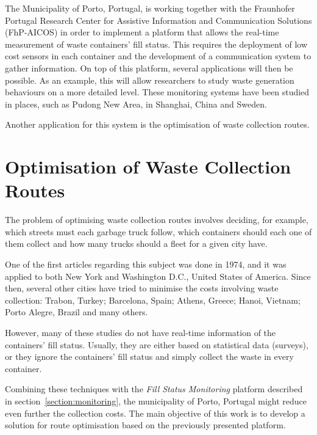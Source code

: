 The Municipality of Porto, Portugal, is working together with the Fraunhofer
Portugal Research Center for Assistive Information and Communication Solutions
(FhP-AICOS) in order to implement a platform that allows the real-time
measurement of waste containers' fill status. This requires the deployment of
low cost sensors in each container and the development of a communication
system to gather information. On top of this platform, several applications
will then be possible. As an example, this will allow researchers to study
waste generation behaviours on a more detailed level. These monitoring systems
have been studied in places, such as Pudong New Area, in Shanghai,
China\citep{Rovetta09,Vicentini09} and Sweden\citep{Johansson06}.

Another application for this system is the optimisation of waste collection
routes.




\section{Optimisation of Waste Collection Routes}
\label{section:optimization}

The problem of optimising waste collection routes involves deciding, for
example, which streets must each garbage truck follow, which containers should
each one of them collect and how many trucks should a fleet for a given city
have.

One of the first articles regarding this subject was done in
1974\citep{Beltrami74}, and it was applied to both New York and Washington
D.C., United States of America. Since then, several other cities have tried to
minimise the costs involving waste collection: Trabon,
Turkey\citep{Apaydin2007}; Barcelona, Spain\citep{Bautista2004}; Athens,
Greece\citep{Karadimas2005}; Hanoi, Vietnam\citep{Tung2000}; Porto Alegre,
Brazil\citep{Li2008} and many others. 

However, many of these studies do not have real-time information of the
containers' fill status. Usually, they are either based on statistical data
(surveys), or they ignore the containers' fill status and simply collect the
waste in every container.

Combining these techniques with the \textit{Fill Status Monitoring} platform
described in section~\ref{section:monitoring}, the municipality of Porto,
Portugal might reduce even further the collection costs. The main objective of
this work is to develop a solution for route optimisation based on the
previously presented platform.



